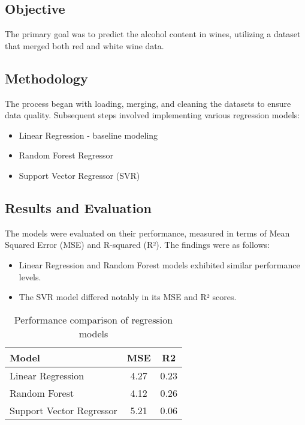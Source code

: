 \documentclass{article}
\begin{document}
    \subsection{Objective}
    The primary goal was to predict the alcohol content in wines, utilizing a dataset that merged both red and white wine data.

    \subsection{Methodology}
    The process began with loading, merging, and cleaning the datasets to ensure data quality. Subsequent steps involved implementing various regression models:
    \begin{itemize}
        \item Linear Regression - baseline modeling
        \item Random Forest Regressor
        \item Support Vector Regressor (SVR)
    \end{itemize}

    \subsection{Results and Evaluation}
    The models were evaluated on their performance, measured in terms of Mean Squared Error (MSE) and R-squared (R²). The findings were as follows:
    \begin{itemize}
        \item Linear Regression and Random Forest models exhibited similar performance levels.
        \item The SVR model differed notably in its MSE and R² scores.
    \end{itemize}

    \setlength{\tabcolsep}{1pt}
    \begin{table}[h]
        \centering
        \begin{tabular}{lcc}
        \hline
        \textbf{Model}           & \textbf{MSE} & \textbf{R2} \\
        \hline
        Linear Regression        & 4.27         & 0.23        \\
        Random Forest            & 4.12         & 0.26        \\
        Support Vector Regressor & 5.21         & 0.06        \\
        \hline
        \end{tabular}
        \caption{Performance comparison of regression models}
        \label{tab:regression_results}
    \end{table}
\end{document}
